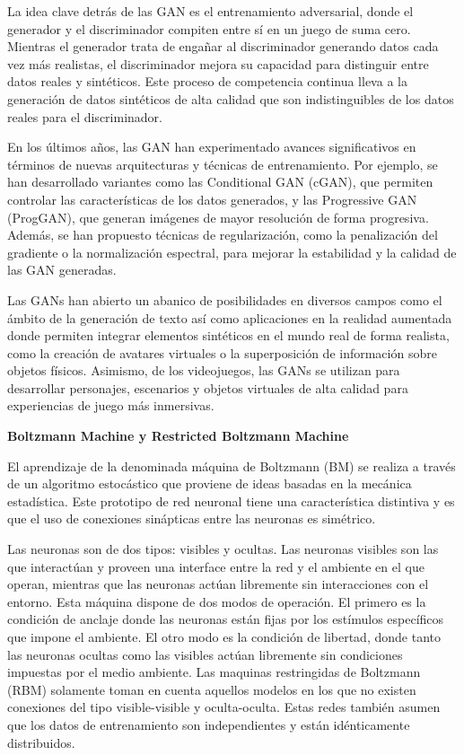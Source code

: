 \documentclass[
  a4paper,
  DIV=11,
  numbers=noendperiod]{scrreprt}
\begin{document}
La idea clave detrás de las GAN es el entrenamiento adversarial, donde
el generador y el discriminador compiten entre sí en un juego de suma
cero. Mientras el generador trata de engañar al discriminador generando
datos cada vez más realistas, el discriminador mejora su capacidad para
distinguir entre datos reales y sintéticos. Este proceso de competencia
continua lleva a la generación de datos sintéticos de alta calidad que
son indistinguibles de los datos reales para el discriminador.

En los últimos años, las GAN han experimentado avances significativos en
términos de nuevas arquitecturas y técnicas de entrenamiento. Por
ejemplo, se han desarrollado variantes como las Conditional GAN (cGAN),
que permiten controlar las características de los datos generados, y las
Progressive GAN (ProgGAN), que generan imágenes de mayor resolución de
forma progresiva. Además, se han propuesto técnicas de regularización,
como la penalización del gradiente o la normalización espectral, para
mejorar la estabilidad y la calidad de las GAN generadas.

Las GANs han abierto un abanico de posibilidades en diversos campos como
el ámbito de la generación de texto así como aplicaciones en la realidad
aumentada donde permiten integrar elementos sintéticos en el mundo real
de forma realista, como la creación de avatares virtuales o la
superposición de información sobre objetos físicos. Asimismo, de los
videojuegos, las GANs se utilizan para desarrollar personajes,
escenarios y objetos virtuales de alta calidad para experiencias de
juego más inmersivas.

\textbf{Boltzmann Machine y Restricted Boltzmann Machine}

El aprendizaje de la denominada máquina de Boltzmann (BM) se realiza a
través de un algoritmo estocástico que proviene de ideas basadas en la
mecánica estadística. Este prototipo de red neuronal tiene una
característica distintiva y es que el uso de conexiones sinápticas entre
las neuronas es simétrico.

Las neuronas son de dos tipos: visibles y ocultas. Las neuronas visibles
son las que interactúan y proveen una interface entre la red y el
ambiente en el que operan, mientras que las neuronas actúan libremente
sin interacciones con el entorno. Esta máquina dispone de dos modos de
operación. El primero es la condición de anclaje donde las neuronas
están fijas por los estímulos específicos que impone el ambiente. El
otro modo es la condición de libertad, donde tanto las neuronas ocultas
como las visibles actúan libremente sin condiciones impuestas por el
medio ambiente. Las maquinas restringidas de Boltzmann (RBM) solamente
toman en cuenta aquellos modelos en los que no existen conexiones del
tipo visible-visible y oculta-oculta. Estas redes también asumen que los
datos de entrenamiento son independientes y están idénticamente
distribuidos.
\end{document}
